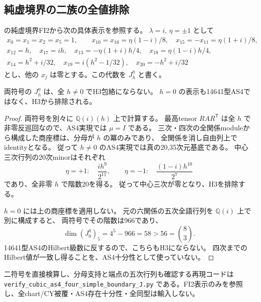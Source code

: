 \subsection{純虚境界の二族の全値排除}
\label{subsec:cubic-as4-boundary-J}
\cite{AS4lowpinned}の純虚境界FI2から次の具体表示を参照する。
$\lambda=i$, $\eta=\pm1$ として
\[
\begin{gathered}
 x_0=x_1=x_2=x_5=1,\qquad
 x_{10}=x_{16}=\eta(1-i)/8,\quad
 x_{15}=-x_{11}=\eta(1+i)/8,\\
 x_{12}=h,\quad x_{17}=ih,\quad
 x_{13}=-\eta(1+i)h/4,\quad x_{18}=\eta(1-i)h/4,\\
 x_{14}=h^2+i/32,\quad x_{19}=i(h^2-1/32),\quad x_{20}=-h^2+i/32
\end{gathered}
\]
とし、他の $x_j$ は零とする。この代数を $J^\eta_h$ と書く。

\begin{proposition}\label{prop:cubic-boundary-J}
両符号の $J^\eta_h$ は、全 $h\ne0$ でH3包絡にならない。
$h=0$ の表示も14641型AS4ではなく、H3から排除される。
\end{proposition}
\begin{proof}
両符号を別々に $\mathbb Q(i)(h)$ 上で計算する。
最高tensor $R A R^{\mathsf T}$ は全 $h$ で非零反巡回なので、AS4実現では $\mu=I$ である。
三次・四次の全関係moduleから構成した商座標は、分母が $h$ の冪のみであり、
全関係を消し自由列上でidentityとなる。
従って $h\ne0$ のAS4実現では真の20,35次元基底である。
中心三次行列の20次minorはそれぞれ
\[
 \eta=+1:\quad \frac{i h^9}{2^{11}},\qquad
 \eta=-1:\quad \frac{(1-i)h^{10}}{2^7}
\]
であり、全非零 $h$ で階数20を得る。
従って中心三次が零となり、H3を排除する。

$h=0$ には上の商座標を適用しない。
元の六関係の五次全語行列を $\mathbb Q(i)$ 上で別に構成すると、
両符号でその階数は966であり、
\[
 \dim(J^\eta_0)_5=4^5-966=58>56=\binom83.
\]
14641型AS4のHilbert級数に反するので、こちらもH3にならない。
四次までのHilbert値が一致し得ることを、AS4十分性として使っていない。
\end{proof}

二符号を直接検算し、分母支持と端点の五次行列も確認する再現コードは
\texttt{verify\_\allowbreak{}cubic\_\allowbreak{}as4\_\allowbreak{}four\_\allowbreak{}simple\_\allowbreak{}boundary\_\allowbreak{}J.py}
である。FI2表示のみを参照し、全chart/CY被覆・AS4存在十分性・全同型は輸入しない。
